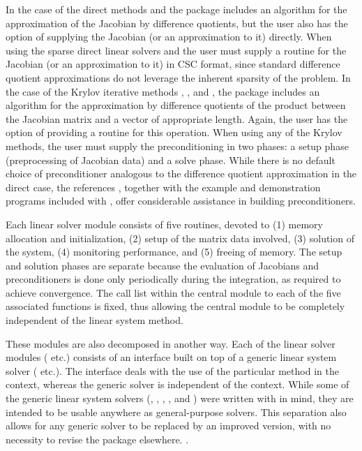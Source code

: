 In the case of the direct methods {\idadense} and {\idaband}
the package includes an algorithm for the approximation of the Jacobian by difference
quotients, but the user also has the option of supplying the Jacobian
(or an approximation to it) directly. When using the sparse direct
linear solvers {\idaklu} and {\idasuperlumt} the user must supply a
routine for the Jacobian (or an approximation to it) in CSC format,
since standard difference quotient approximations do not leverage the
inherent sparsity of the problem. In the case of the Krylov iterative methods 
{\idaspgmr}, {\idaspbcg}, and {\idasptfqmr}, the package includes an algorithm for
the approximation by difference quotients of the product between the Jacobian matrix
and a vector of appropriate length. Again, the user has the option of providing
a routine for this operation.
When  using any of the Krylov
methods, the user must supply the preconditioning in two phases: 
a setup phase (preprocessing of Jacobian data) and a solve phase.
While there is no default
choice of preconditioner analogous to the difference quotient
approximation in the direct case, the references
\cite{BrHi:89, Byr:92}, together with
the example and demonstration programs included with {\idas}, offer
considerable assistance in building preconditioners.

Each {\idas} linear solver module consists of five routines, devoted to
(1) memory allocation and initialization, (2) setup of the matrix data
involved, (3) solution of the system, (4) monitoring performance,
and (5) freeing of memory.  
The setup and solution phases are separate because the evaluation of
Jacobians and preconditioners is done only periodically during the
integration, as required to achieve convergence. The call list within
the central {\idas} module to each of the five associated functions is
fixed, thus allowing the central module to be completely independent
of the linear system method.

These modules are also decomposed in another way.
Each of the linear solver modules ({\idadense} etc.) consists of an
interface built on top of a generic linear system solver ({\dense}
etc.).  The interface deals with the use of the particular method in
the {\idas} context, whereas the generic solver is independent of the
context.  While some of the generic linear system solvers ({\dense},
{\band}, {\spgmr}, {\spbcg}, and {\sptfqmr}) were written with
{\sundials} in mind, they are intended to be usable anywhere as
general-purpose solvers.  This separation also allows for any generic
solver to be replaced by an improved version, with no necessity to
revise the {\idas} package elsewhere. 
.

